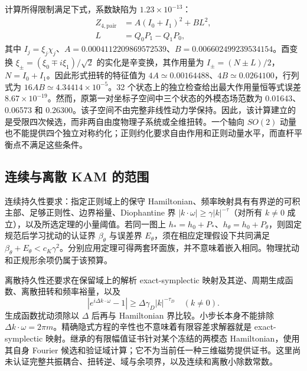 计算所得限制满足下式，系数缺陷为 $1.23\times10^{-13}$：
\begin{equation}
 \begin{aligned}
 Z_{4,\mathrm{pair}}&=A(I_0+I_1)^2+BL^2,\\
 L&=Q_0P_1-Q_1P_0,
 \end{aligned}
 \label{eq:learn-pair-form}
\end{equation}
其中 $I_j=\xi_j\chi_j$、$A=0.0004112209869572539$、$B=0.006602499239534154$。酉变换 $\xi_\pm=(\xi_0\mp i\xi_1)/\sqrt2$ 的实化是辛变换，其作用量为 $I_\pm=(N\pm L)/2$，$N=I_0+I_1$。因此形式扭转的特征值为 $4A\simeq0.00164488$、$4B\simeq0.0264100$，行列式为 $16AB\simeq4.34414\times10^{-5}$。32 个状态上的独立检查给出最大作用量恒等式误差 $8.67\times10^{-19}$。然而，原第一对坐标子空间中三个状态的外模态场范数为 0.01643、0.06573 和 0.26300。该子空间不由完整非线性动力学保持。因此，该计算建立的是受限四次候选，而非两自由度物理子系统或全维扭转。一个轴向 $SO(2)$ 动量也不能提供四个独立对称约化；正则约化要求自由作用和正则动量水平，而直杆平衡点不满足这些条件。




\subsection{连续与离散 KAM 的范围}
连续持久性要求：指定正则域上的保守 Hamiltonian、频率映射具有有界逆的可积主部、足够正则性、边界裕量、Diophantine 界 $|k\cdot\omega|\ge\gamma|k|^{-\tau}$（对所有 $k\ne0$ 成立），以及所选定理的小量阈值\citep{Poschel2001}。若同一图上 $h_*=h_0+P_*$、$h_\theta=h_0+P_\theta$，则固定规范后学习扰动的认证界 $\beta_\theta$ 与误差界 $E_\theta$，须在相应定理假设下共同满足 $\beta_\theta+E_\theta<c_K\gamma^2$。分别应用定理可得两套环面族，并不意味着嵌入相同。物理扰动和正规形余项仍属于该预算。

离散持久性还要求在保留域上的解析 exact-symplectic 映射及其逆、周期生成函数、离散扭转和频率裕量，以及
\begin{equation}
 |e^{i\Delta k\cdot\omega}-1|\ge\Delta\gamma_D|k|^{-\tau_D}\quad(k\ne0).
 \label{eq:learn-discrete-divisor}
\end{equation}
生成函数扰动须除以 $\Delta$ 后再与 Hamiltonian 界比较\citep{Shang1999}。小步长本身不能排除 $\Delta k\cdot\omega=2\pi m$。精确隐式方程的辛性也不意味着有限容差求解器就是 exact-symplectic 映射。继承的有限幅值证书针对某个冻结的两模态 Hamiltonian，使用其自身 Fourier 候选和验证域计算；它不为当前任一种三维磁势提供证书。这里尚未认证完整共振耦合、扭转逆、域与余项界，以及连续和离散小除数常数。
